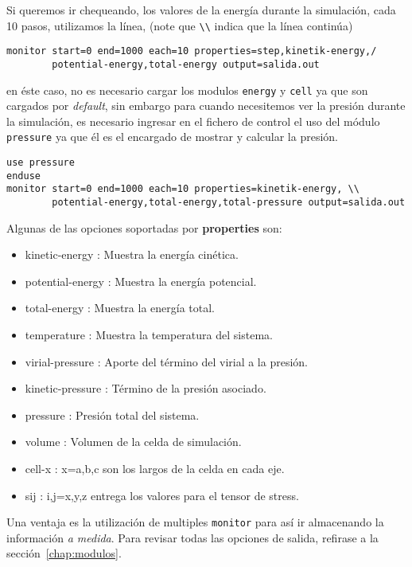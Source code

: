 Si queremos ir chequeando, los valores de la energ\'ia durante la simulaci\'on, cada 10 pasos, utilizamos la l\'inea, (note que \verb|\\| indica que la l\'inea contin\'ua)

\begin{verbatim}
monitor start=0 end=1000 each=10 properties=step,kinetik-energy,/
        potential-energy,total-energy output=salida.out
\end{verbatim}

en \'este caso, no es necesario cargar los modulos \verb|energy| y \verb|cell| ya que son cargados por \textit{default}, sin embargo para cuando necesitemos ver la presi\'on durante la simulaci\'on, es necesario ingresar en el fichero de control el uso del m\'odulo \verb|pressure| ya que \'el es el encargado de mostrar y calcular la presi\'on.

\begin{verbatim}
use pressure
enduse
monitor start=0 end=1000 each=10 properties=kinetik-energy, \\
        potential-energy,total-energy,total-pressure output=salida.out
\end{verbatim}

Algunas de las opciones soportadas por \textbf{properties} son:

\begin{itemize}
 \item kinetic-energy : Muestra la energ\'ia cin\'etica.
 \item potential-energy : Muestra la energ\'ia potencial.
 \item total-energy : Muestra la energ\'ia total.
 \item temperature : Muestra la temperatura del sistema.
 \item virial-pressure : Aporte del t\'ermino del virial a la presi\'on.
 \item kinetic-pressure : T\'ermino de la presi\'on asociado.
 \item pressure : Presi\'on total del sistema.
 \item volume : Volumen de la celda de simulaci\'on.
 \item cell-x : x=a,b,c son los largos de la celda en cada eje.
 \item sij : i,j=x,y,z entrega los valores para el tensor de stress.
\end{itemize}

Una ventaja es la utilizaci\'on de multiples \verb|monitor| para as\'i ir almacenando la informaci\'on \textit{a medida}. Para revisar todas las opciones de salida, refirase a la secci\'on~\ref{chap:modulos}.

